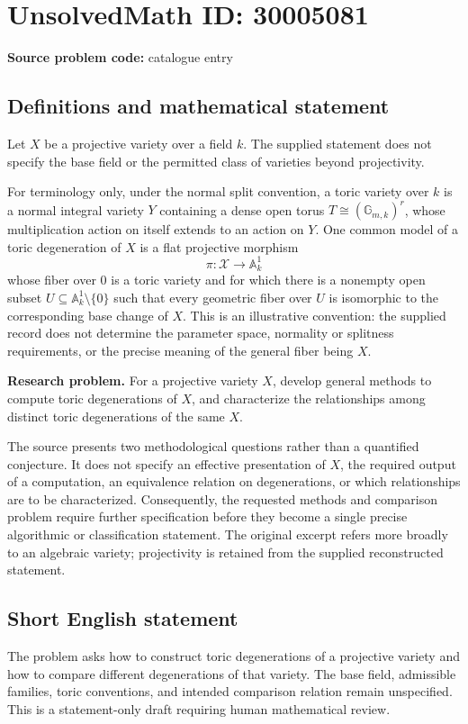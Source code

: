 \documentclass[11pt]{article}
\begin{document}
\section*{UnsolvedMath ID: 30005081}
\textbf{Source problem code:} catalogue entry
\subsection{Definitions and mathematical statement}
Let \(X\) be a projective variety over a field \(k\). The supplied statement does not specify the base field or the permitted class of varieties beyond projectivity.

For terminology only, under the normal split convention, a toric variety over \(k\) is a normal integral variety \(Y\) containing a dense open torus \(T\cong(\mathbb G_{m,k})^r\), whose multiplication action on itself extends to an action on \(Y\). One common model of a toric degeneration of \(X\) is a flat projective morphism
\[
\pi\colon\mathcal X\longrightarrow\mathbb A^1_k
\]
whose fiber over \(0\) is a toric variety and for which there is a nonempty open subset \(U\subseteq\mathbb A^1_k\setminus\{0\}\) such that every geometric fiber over \(U\) is isomorphic to the corresponding base change of \(X\). This is an illustrative convention: the supplied record does not determine the parameter space, normality or splitness requirements, or the precise meaning of the general fiber being \(X\).

\textbf{Research problem.} For a projective variety \(X\), develop general methods to compute toric degenerations of \(X\), and characterize the relationships among distinct toric degenerations of the same \(X\).

The source presents two methodological questions rather than a quantified conjecture. It does not specify an effective presentation of \(X\), the required output of a computation, an equivalence relation on degenerations, or which relationships are to be characterized. Consequently, the requested methods and comparison problem require further specification before they become a single precise algorithmic or classification statement. The original excerpt refers more broadly to an algebraic variety; projectivity is retained from the supplied reconstructed statement.
\subsection{Short English statement}
The problem asks how to construct toric degenerations of a projective variety and how to compare different degenerations of that variety. The base field, admissible families, toric conventions, and intended comparison relation remain unspecified. This is a statement-only draft requiring human mathematical review.
\end{document}
